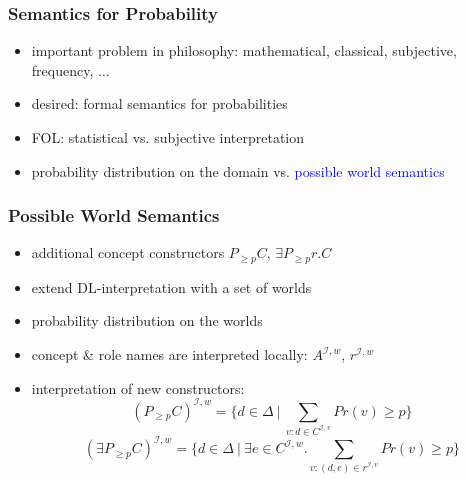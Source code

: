 \documentclass[draft]{beamer}
\newcommand{\I}{\ensuremath{\mathcal{I}}\xspace}
\renewcommand{\emph}[1]{\textcolor{blue}{#1}}
\begin{document}
\begin{frame}
	\frametitle{Semantics for Probability}
	\begin{itemize}
		\item important problem in philosophy: mathematical, classical, subjective, frequency, $\ldots$
		\item desired: formal semantics for probabilities
		\item FOL: statistical vs. subjective interpretation \cite{halpern}
		\item probability distribution on the domain vs. \emph{possible world semantics}
	\end{itemize}
\end{frame}


\begin{frame}
	\frametitle{Possible World Semantics}
	\begin{itemize}
		\item additional concept constructors $P_{\geq p}C$, $\exists P_{\geq p}r.C$
		\item extend DL-interpretation with a set of worlds
		\item probability distribution on the worlds %
		\item concept \& role names are interpreted locally: $A^{\I,w}$, $r^{\I,w}$
		\item interpretation of new constructors:
			$$(P_{\geq p}C)^{\I,w}=\{d\in\Delta~|~\sum_{v:d\in C^{\I,v}}Pr(v)\geq p\}$$
			$$(\exists P_{\geq p}C)^{\I,w}=\{d\in\Delta~|~\exists e\in C^{\I,w}.\sum_{v:(d,e)\in r^{\I,v}}Pr(v)\geq p\}$$
	\end{itemize}
\end{frame}
\end{document}

